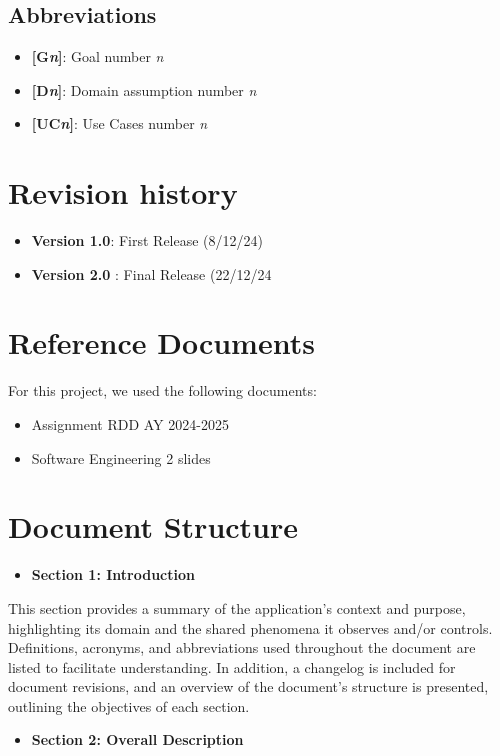 \subsection{Abbreviations}
\begin{itemize}
    \item \textbf{[G\textit{n}]}: Goal number \textit{n}
    \item \textbf{[D\textit{n}]}: Domain assumption number \textit{n}
    \item \textbf{[UC\textit{n}]}: Use Cases number \textit{n}
\end{itemize}
\section{Revision history}
\begin{itemize}
    \item \textbf{Version 1.0}: First Release (8/12/24)
    \item \textbf{Version 2.0} : Final Release (22/12/24
\end{itemize}
\section{Reference Documents}
For this project, we used the following documents: 
\begin{itemize}
    \item Assignment RDD AY 2024-2025
    \item Software Engineering 2 slides
\end{itemize}

\section{Document Structure}

\begin{itemize}
    \item\textbf{Section 1: Introduction} 
\end{itemize}
This section provides a summary of the application's context and purpose, highlighting its domain and the shared phenomena it observes and/or controls. Definitions, acronyms, and abbreviations used throughout the document are listed to facilitate understanding. In addition, a changelog is included for document revisions, and an overview of the document’s structure is presented, outlining the objectives of each section.

\begin{itemize}
    \item\textbf{Section 2: Overall Description} 
\end{itemize}

